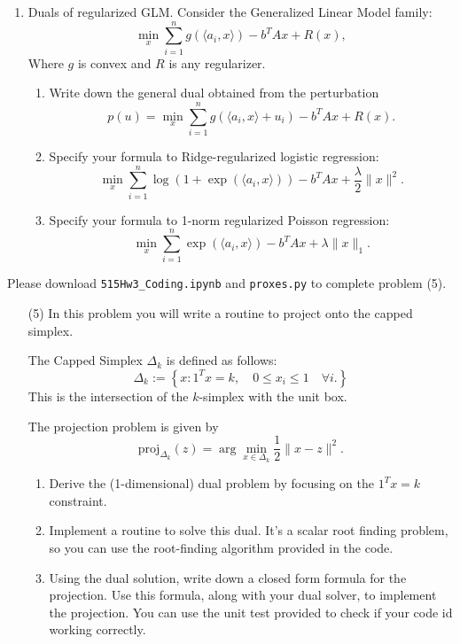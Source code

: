 \documentclass[11pt]{amsart}
\begin{document}
\begin{enumerate}
\item Duals of regularized GLM. Consider the Generalized Linear Model family: 
\[
\min_{x} \sum_{i=1}^n g(\langle a_i, x\rangle) - b^TAx + R(x),
\]
Where $g$ is convex and $R$ is any regularizer. 
\begin{enumerate}
\item Write down the general dual obtained from the perturbation 
\[
p(u) = \min_{x} \sum_{i=1}^n g(\langle a_i, x\rangle + u_i) - b^TAx + R(x).
\]
\bigskip\bigskip
\item Specify your formula to Ridge-regularized logistic regression: 
\[
\min_x \sum_{i=1}^n \log(1+\exp(\langle a_i, x \rangle))  - b^TAx  + \frac{\lambda}{2}\|x\|^2. 
\]
\bigskip\bigskip
\item Specify your formula to 1-norm regularized Poisson regression: 
\[
\min_x \sum_{i=1}^n \exp(\langle a_i, x \rangle) - b^TAx +  \lambda\|x\|_1. 
\]
\end{enumerate}
\bigskip \bigskip
\end{enumerate}
\vskip 8pt
Please download \texttt{515Hw3\_Coding.ipynb} and \texttt{proxes.py} to complete problem (5).

\vskip 16pt
\begin{enumerate}
\item[(5)] In this problem you will write a routine to project onto the capped simplex. 

The Capped Simplex $\Delta_k$ is defined as follows: 
\[
\Delta_k := \left\{x: 1^Tx = k, \quad 0 \leq x_i \leq 1 \quad \forall i. \right\}
\]
This is the intersection of the $k$-simplex with the unit box. 

The projection problem is given by 
\[
\mbox{proj}_{\Delta_k}(z) = \arg\min_{x \in \Delta_k} \frac{1}{2}\|x-z\|^2.
\]
\begin{enumerate}
\item Derive the (1-dimensional) dual problem by focusing on the $1^Tx = k$ constraint. 
\bigskip \bigskip
\item Implement a routine to solve this dual. It's a scalar root finding problem, 
so you can use the root-finding algorithm provided in the code.  
\bigskip \bigskip
\item Using the dual solution, write down a closed form formula for the projection.  
Use this formula, along with your dual solver, to implement the projection. You can use the unit test 
provided to check if your code id working correctly. 


\end{enumerate}




\end{enumerate}
\end{document}
